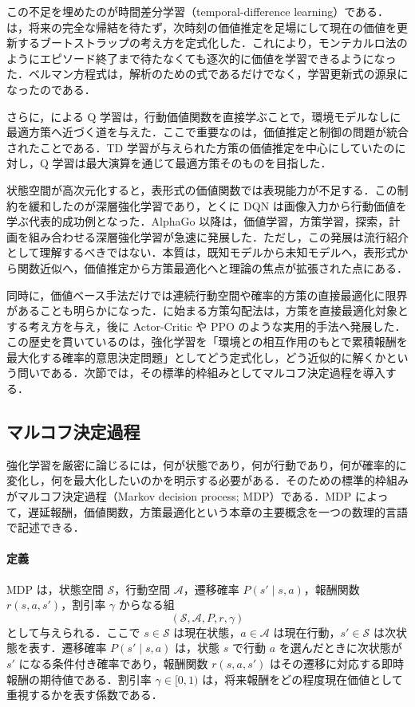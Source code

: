 この不足を埋めたのが時間差分学習（temporal-difference learning）である．\citet{Sutton1988}は，将来の完全な帰結を待たず，次時刻の価値推定を足場にして現在の価値を更新するブートストラップの考え方を定式化した．これにより，モンテカルロ法のようにエピソード終了まで待たなくても逐次的に価値を学習できるようになった．ベルマン方程式は，解析のための式であるだけでなく，学習更新式の源泉になったのである．

さらに，\citet{WatkinsDayan1992}による Q 学習は，行動価値関数を直接学ぶことで，環境モデルなしに最適方策へ近づく道を与えた．ここで重要なのは，価値推定と制御の問題が統合されたことである．TD 学習が与えられた方策の価値推定を中心にしていたのに対し，Q 学習は最大演算を通じて最適方策そのものを目指した．

状態空間が高次元化すると，表形式の価値関数では表現能力が不足する．この制約を緩和したのが深層強化学習であり，とくに DQN は画像入力から行動価値を学ぶ代表的成功例となった\cite{Mnih2015}．AlphaGo 以降は，価値学習，方策学習，探索，計画を組み合わせる深層強化学習が急速に発展した\cite{Silver2016}．ただし，この発展は流行紹介として理解するべきではない．本質は，既知モデルから未知モデルへ，表形式から関数近似へ，価値推定から方策最適化へと理論の焦点が拡張された点にある．

同時に，価値ベース手法だけでは連続行動空間や確率的方策の直接最適化に限界があることも明らかになった．\citet{Williams1992}に始まる方策勾配法は，方策を直接最適化対象とする考え方を与え，後に Actor-Critic や PPO のような実用的手法へ発展した\cite{Schulman2015,Schulman2017}．この歴史を貫いているのは，強化学習を「環境との相互作用のもとで累積報酬を最大化する確率的意思決定問題」としてどう定式化し，どう近似的に解くかという問いである．次節では，その標準的枠組みとしてマルコフ決定過程を導入する．

\subsection{マルコフ決定過程}

強化学習を厳密に論じるには，何が状態であり，何が行動であり，何が確率的に変化し，何を最大化したいのかを明示する必要がある．そのための標準的枠組みがマルコフ決定過程（Markov decision process; MDP）である．MDP によって，遅延報酬，価値関数，方策最適化という本章の主要概念を一つの数理的言語で記述できる．

\paragraph*{定義}
MDP は，状態空間 $\mathcal{S}$，行動空間 $\mathcal{A}$，遷移確率 $P(s' \mid s,a)$，報酬関数 $r(s,a,s')$，割引率 $\gamma$ からなる組
\begin{equation}
(\mathcal{S}, \mathcal{A}, P, r, \gamma)
\end{equation}
として与えられる．ここで $s \in \mathcal{S}$ は現在状態，$a \in \mathcal{A}$ は現在行動，$s' \in \mathcal{S}$ は次状態を表す．遷移確率 $P(s' \mid s,a)$ は，状態 $s$ で行動 $a$ を選んだときに次状態が $s'$ になる条件付き確率であり，報酬関数 $r(s,a,s')$ はその遷移に対応する即時報酬の期待値である．割引率 $\gamma \in [0,1)$ は，将来報酬をどの程度現在価値として重視するかを表す係数である．

